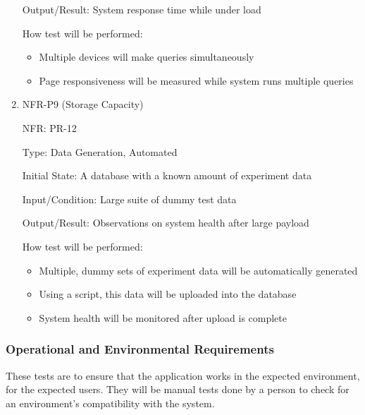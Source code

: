 \documentclass[12pt, titlepage]{article}
\begin{document}
\begin{enumerate}
  Output/Result: System response time while under load
  
  How test will be performed:
  \begin{itemize}
    \item Multiple devices will make queries simultaneously
    \item Page responsiveness will be measured while system runs multiple
    queries
  \end{itemize}

  \item{NFR-P9 (Storage Capacity)\\}
  
  NFR: PR-12
  
  Type: Data Generation, Automated
  
  Initial State: A database with a known amount of experiment data
  
  Input/Condition: Large suite of dummy test data
  
  Output/Result: Observations on system health after large payload
  
  How test will be performed:
  \begin{itemize}
    \item Multiple, dummy sets of experiment data will be automatically
    generated
    \item Using a script, this data will be uploaded into the database
    \item System health will be monitored after upload is complete
  \end{itemize}
  \end{enumerate}

\subsubsection{Operational and Environmental Requirements}
  These tests are to ensure that the application works in the expected
  environment, for the expected users. They will be manual tests done by a
  person to check for an environment's compatibility with the system.
\end{document}
